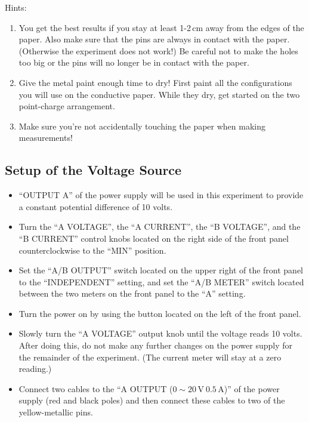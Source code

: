 \myskip
\noindent Hints:
\begin{enumerate}
    \item You get the best results if you stay at least 1-2$\,\mathrm{cm}$ away from the edges of the paper. Also make sure that the pins are always in contact with the paper. (Otherwise the experiment does not work!) Be careful not to make the holes too big or the pins will no longer be in contact with the paper.
    \item Give the metal paint enough time to dry! First paint all the configurations you will use on the conductive paper. While they dry, get started on the two point-charge arrangement.
    \item Make sure you're not accidentally touching the paper when making measurements!
\end{enumerate}

\subsection{Setup of the Voltage Source}

\begin{itemize}
    \item ``OUTPUT A'' of the power supply will be used in this experiment to provide a constant potential difference of 10 volts.
    \item Turn the ``A VOLTAGE'', the ``A CURRENT'', the ``B VOLTAGE'', and the ``B CURRENT'' control knobs located on the right side of the front panel counterclockwise to the ``MIN'' position.
    \item Set the ``A/B OUTPUT'' switch located on the upper right of the front panel to the ``INDEPENDENT'' setting, and set the ``A/B METER'' switch located between the two meters on the front panel to the ``A'' setting.
    \item Turn the power on by using the button located on the left of the front panel.
    \item Slowly turn the ``A VOLTAGE'' output knob until the voltage reads 10 volts. After doing this, do not make any further changes on the power supply for the remainder of the experiment. (The current meter will stay at a zero reading.)
    \item Connect two cables to the ``A OUTPUT ($0\sim 20\,\mathrm{V}\  0.5\,\mathrm{A}$)'' of the power supply (red and black poles) and then connect these cables to two of the yellow-metallic pins.
\end{itemize}

